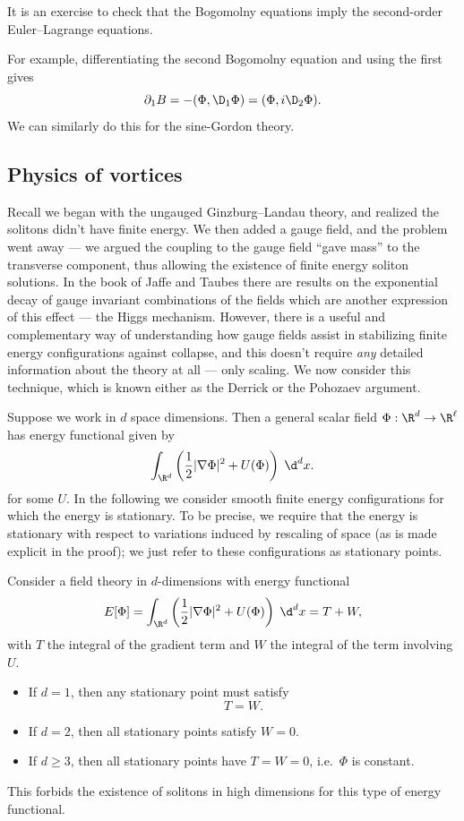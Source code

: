 \documentclass[a4paper]{article}
\begin{document}
It is an exercise to check that the Bogomolny equations imply the second-order Euler--Lagrange equations.

For example, differentiating the second Bogomolny equation and using the first gives
\[
  \partial_1 B = - (\Phi, \D_1 \Phi) = (\Phi, i \D_2 \Phi).
\]
We can similarly do this for the sine-Gordon theory.

\subsection{Physics of vortices}
Recall we began with the ungauged Ginzburg--Landau theory, and realized the solitons didn't have finite energy. We then added a gauge field, and the problem went away --- we argued the coupling to the gauge field ``gave mass'' to the transverse component, thus allowing the existence of finite energy soliton solutions. In the book of Jaffe and Taubes there are results on the exponential decay of gauge invariant combinations of the fields which are another expression of this effect --- the Higgs mechanism. However, there is a useful and complementary way of understanding how gauge fields assist in stabilizing finite energy configurations against collapse, and this doesn't require \emph{any} detailed information about the theory at all --- only scaling. We now consider this technique, which is known either as the Derrick or the Pohozaev argument.

Suppose we work in $d$ space dimensions. Then a general scalar field $\Phi: \R^d \to \R^\ell$ has energy functional given by
\[
  \int_{\R^d} \left(\frac{1}{2} |\nabla \Phi|^2 + U(\Phi)\right)\;\d^d x.
\]
for some $U$. In the following we consider smooth finite energy configurations for which the energy is stationary. To be precise, we require that the energy is stationary with respect to variations induced by rescaling of space (as is made explicit in the proof); we just refer to these configurations as stationary points.

\begin{thm}
  Consider a field theory in $d$-dimensions with energy functional
  \[
    E[\Phi] = \int_{\R^d}\left(\frac{1}{2} |\nabla \Phi|^2 + U(\Phi)\right)\;\d^d x = T + W,
  \]
  with $T$ the integral of the gradient term and $W$ the integral of the term involving $U$.
  \begin{itemize}
    \item If $d = 1$, then any stationary point must satisfy
      \[
        T = W.
      \]
    \item If $d = 2$, then all stationary points satisfy $W = 0$.
    \item If $d \geq 3$, then all stationary points have $T = W = 0$, i.e.\ $\Phi$ is constant.
  \end{itemize}
\end{thm}
This forbids the existence of solitons in high dimensions for this type of energy functional.
\end{document}
